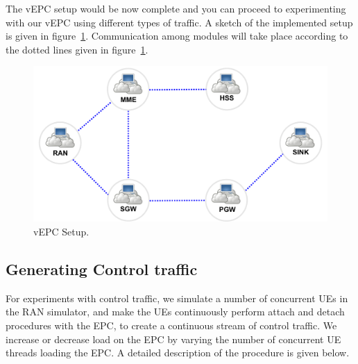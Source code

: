 \pdfminorversion=4\documentclass[hidelinks]{report}
\begin{document}
The vEPC setup would be now complete and you can proceed to experimenting with our vEPC using different types of traffic. A sketch of the implemented setup is given in figure~\ref{setup}. Communication among modules will take place according to the dotted lines given in figure~\ref{setup}.

\begin{figure}[H]

\centering
\includegraphics[scale=0.4]{setup}
\caption{vEPC Setup.}
\label{setup}

\end{figure}

\subsection*{Generating Control traffic}

For experiments with control traffic, we simulate a number of concurrent UEs in the RAN simulator, and make the UEs continuously perform attach and detach procedures with the EPC, to create a continuous stream of control traffic. We increase or decrease load on the EPC by varying the number of concurrent UE threads loading the EPC. A detailed description of the procedure is given below.
\end{document}
